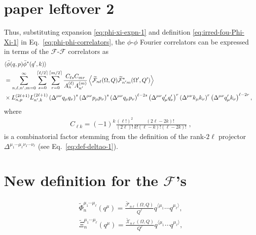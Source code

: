 \documentclass[aps,prd,preprint,nofootinbib,amsmath,amssymb,showpacs,longbibliography,singlecolumn,superscriptaddress,10pt]{revtex4-1}
\theoremstyle{plain}
\theoremstyle{definition}
\begin{document}
\section{paper leftover 2}

Thus, substituting expansion \eqref{eq:phi-xi-expn-1} and definition \eqref{eq:irred-fou-Phi-Xi-1} in Eq.~\eqref{eq:phi-phi-correlators}, the  $\phi$-$\phi$ Fourier correlators can be expressed in terms of the $\mathcal{F}$-$\mathcal{F}$ correlators as 
%
\begin{equation}
\begin{aligned}
&
\langle \Bar{\phi}(q,p) \Bar{\phi}^{*}(q',k)  \rangle 
\\
&
=
\sum_{n,\ell, n',m = 0}^{\infty}
\sum_{s=0}^{\lceil \ell / 2 \rceil} \sum_{r=0}^{\lceil m / 2 \rceil} 
\frac{C_{\ell s} 
C_{m r}}{A_{n}^{(\ell)} A_{n'}^{(m)} }
\left\langle \widetilde{\mathcal{F}}_{n\ell}(\Omega, Q)
 \widetilde{\mathcal{F}}^{*}_{n'm}(\Omega', Q')
 \right\rangle
\\
&
\times
L^{(2 \ell + 1)}_{n, p}
L^{(2 \ell + 1)}_{n', k}
\left(\Delta^{\mu \nu} q_{\mu} q_{\nu}\right)^{s} \left(\Delta^{\mu \nu} p_{\mu} p_{\nu}\right)^{s} 
\left(\Delta^{\mu \nu} q_{\mu} p_{\nu}\right)^{\ell - 2s}
\left(\Delta^{\mu \nu} q'_{\mu} q'_{\nu}\right)^{r} \left(\Delta^{\mu \nu} k_{\mu} k_{\nu}\right)^{r} 
\left(\Delta^{\mu \nu} q'_{\mu} k_{\nu}\right)^{\ell - 2r},
\end{aligned}    
\end{equation}
%
where
%
\begin{subequations}
\label{eq:def-deltao-2-main}
\begin{align}
 &
 C_{\ell k} = (-1)^{k} \frac{(\ell!)^{2}}{(2 \ell)!} \frac{(2 \ell - 2k)!}{k!(\ell-k)!(\ell-2k)!}\;,
\end{align}    
\end{subequations}
%
is a combinatorial factor stemming from the definition of the rank-$2 \ell$ projector $\Delta^{\mu_{1} \cdots \mu_{\ell}\nu_{1} \cdots \nu_{\ell}}$ (see Eq.~\eqref{eq:def-deltao-1}).


\section{New definition for the $\mathcal{F}$'s }


%
\begin{subequations}
\label{eq:irred-fou-Phi-Xi}
\begin{align}
&
\label{eq:irred-fou-Phi-Xi-1}
\widetilde{\Phi}_{n}^{\mu_{1} \cdots \mu_{\ell}} (q^{\mu})
=
\frac{\widetilde{\mathcal{F}}_{n\ell}(\Omega, Q)}{Q^{\ell}}
q^{\langle \mu_{1}} \cdots q^{ \mu_{\ell} \rangle},
\\
&
\label{eq:irred-fou-Phi-Xi-2}
\widetilde{\Xi}_{n}^{\mu_{1} \cdots \mu_{\ell}} (q^{\mu}) = \frac{\widetilde{\mathcal{X}}_{n\ell}(\Omega, Q)}{Q^{\ell}}
q^{\langle \mu_{1}} \cdots q^{ \mu_{\ell} \rangle},
\end{align}    
\end{subequations}
%
\end{document}

